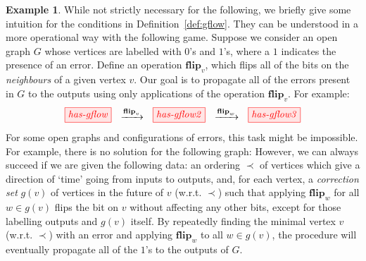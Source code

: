 \documentclass[a4paper,onecolumn,superscriptaddress,11pt,accepted=2020-04-27]{quantumarticle}
\theoremstyle{definition}
\newtheorem{example}[theorem]{Example}
\begin{document}
\begin{example}
While not strictly necessary for the following, we briefly give some intuition for the
conditions in Definition~\ref{def:gflow}. They can be understood in a more operational way with the following game. Suppose we consider an open graph $G$ whose vertices are labelled with $0$'s and $1$'s, where a $1$ indicates the presence of an error. Define an operation $\textbf{flip}_v$, which flips all of the bits on the \textit{neighbours} of a given vertex $v$. Our goal is to propagate all of the errors present in $G$ to the outputs using only applications of the operation $\textbf{flip}_v$. For example:
\begin{equation}\label{eq:has-gflow}
\tikzfig{has-gflow}
\ \  \xrightarrow{\textbf{flip}_v} \ \ 
\tikzfig{has-gflow2}
\ \  \xrightarrow{\textbf{flip}_w} \ \ 
\tikzfig{has-gflow3}
\end{equation}
For some open graphs and configurations of errors, this task might be impossible. For example, there is no solution for the following graph:
However, we can always succeed if we are given the following data: an ordering $\prec$ of vertices which give a direction of `time' going from inputs to outputs, and, for each vertex, a \textit{correction set} $g(v)$ of vertices in the future of $v$ (w.r.t. $\prec$) such that applying $\textbf{flip}_w$ for all $w \in g(v)$ flips the bit on $v$ without affecting any other bits, except for those labelling outputs and $g(v)$ itself. By repeatedly finding the minimal vertex $v$ (w.r.t. $\prec$) with an error and applying $\textbf{flip}_w$ to all $w \in g(v)$, the procedure will eventually propagate all of the $1$'s to the outputs of $G$.
\end{example}
\end{document}
